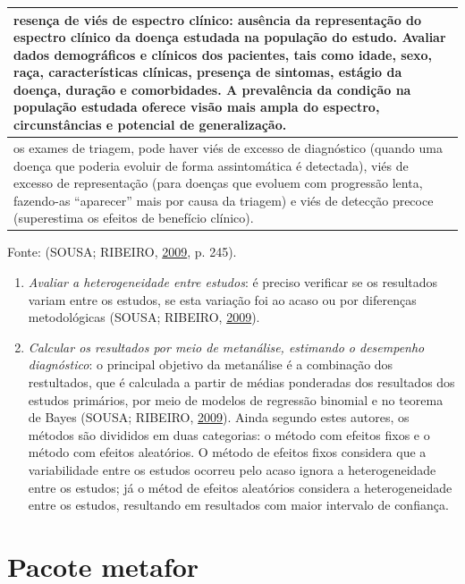 \documentclass[12pt,brazil,oneside]{book}
\begin{document}
\begin{longtable}[]{@{}l@{}}
\toprule
resença de viés de espectro clínico: ausência da representação do espectro clínico da doença estudada na população do estudo. Avaliar dados demográficos e clínicos dos pacientes, tais como idade, sexo, raça, características clínicas, presença de sintomas, estágio da doença, duração e comorbidades. A prevalência da condição na população estudada oferece visão mais ampla do espectro, circunstâncias e potencial de generalização.\tabularnewline
\midrule
\endhead
os exames de triagem, pode haver viés de excesso de diagnóstico (quando uma doença que poderia evoluir de forma assintomática é detectada), viés de excesso de representação (para doenças que evoluem com progressão lenta, fazendo-as ``aparecer'' mais por causa da triagem) e viés de detecção precoce (superestima os efeitos de benefício clínico).\tabularnewline
\bottomrule
\end{longtable}

Fonte: (SOUSA; RIBEIRO, \protect\hyperlink{ref-Sousa2009}{2009}, p. 245).

\begin{enumerate}
\def\labelenumi{\alph{enumi}.}
\setcounter{enumi}{4}
\item
  \emph{Avaliar a heterogeneidade entre estudos}: é preciso verificar se os resultados variam entre os estudos, se esta variação foi ao acaso ou por diferenças metodológicas (SOUSA; RIBEIRO, \protect\hyperlink{ref-Sousa2009}{2009}).
\item
  \emph{Calcular os resultados por meio de metanálise, estimando o desempenho diagnóstico}: o principal objetivo da metanálise é a combinação dos restultados, que é calculada a partir de médias ponderadas dos resultados dos estudos primários, por meio de modelos de regressão binomial e no teorema de Bayes (SOUSA; RIBEIRO, \protect\hyperlink{ref-Sousa2009}{2009}). Ainda segundo estes autores, os métodos são divididos em duas categorias: o método com efeitos fixos e o método com efeitos aleatórios. O método de efeitos fixos considera que a variabilidade entre os estudos ocorreu pelo acaso ignora a heterogeneidade entre os estudos; já o métod de efeitos aleatórios considera a heterogeneidade entre os estudos, resultando em resultados com maior intervalo de confiança.
\end{enumerate}

\hypertarget{pacote-metafor}{%
\section{Pacote metafor}\label{pacote-metafor}}
\end{document}
